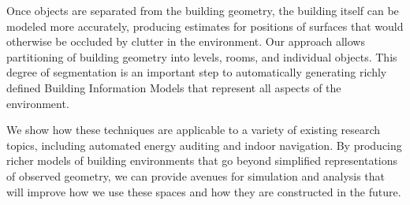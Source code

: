 \documentclass[12pt,onecolumn,oneside]{book}
\begin{document}
Once objects are separated from the building geometry, the building itself can be modeled more accurately, producing estimates for positions of surfaces that would otherwise be occluded by clutter in the environment.  Our approach allows partitioning of building geometry into levels, rooms, and individual objects.  This degree of segmentation is an important step to automatically generating richly defined Building Information Models that represent all aspects of the environment. 

We show how these techniques are applicable to a variety of existing research topics, including automated energy auditing and indoor navigation.  By producing richer models of building environments that go beyond simplified representations of observed geometry, we can provide avenues for simulation and analysis that will improve how we use these spaces and how they are constructed in the future.


%

\vfill

\end{document}
